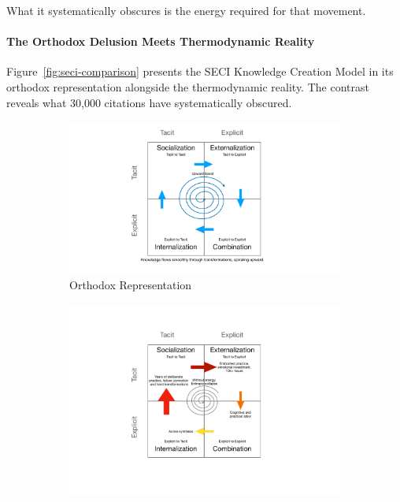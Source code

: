 What it systematically obscures is the energy required for that movement.

\paragraph{The Orthodox Delusion Meets Thermodynamic Reality}

Figure~\ref{fig:seci-comparison} presents the SECI Knowledge Creation Model in its orthodox representation alongside the thermodynamic reality. The contrast reveals what 30,000 citations have systematically obscured.

\begin{figure}[htbp]
\centering
\begin{subfigure}[b]{0.48\textwidth}
    \centering
    \includegraphics[width=\textwidth]{../figures/seci-orthodox}
    \caption{Orthodox Representation}
    \label{fig:seci-orthodox}
\end{subfigure}
\hfill
\begin{subfigure}[b]{0.48\textwidth}
    \centering
    \includegraphics[width=\textwidth]{../figures/seci-thermodynamic}

\end{subfigure}
\end{figure}
